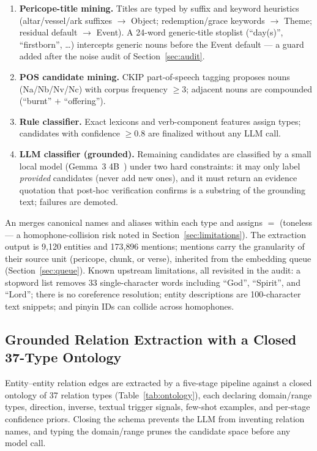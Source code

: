 \begin{enumerate}
\item \textbf{Pericope-title mining.} Titles are typed by suffix and
keyword heuristics (altar/vessel/ark suffixes $\to$ Object;
redemption/grace keywords $\to$ Theme; residual default $\to$ Event). A
24-word generic-title stoplist (``day(s)'', ``firstborn'', \ldots)
intercepts generic nouns before the Event default --- a guard added after
the noise audit of Section~\ref{sec:audit}.
\item \textbf{POS candidate mining.} CKIP part-of-speech tagging proposes
nouns (Na/Nb/Nv/Nc) with corpus frequency $\ge 3$; adjacent nouns are
compounded (\eg ``burnt'' $+$ ``offering'').
\item \textbf{Rule classifier.} Exact lexicons and verb-component
features assign types; candidates with confidence $\ge 0.8$ are finalized
without any LLM call.
\item \textbf{LLM classifier (grounded).} Remaining candidates are
classified by a small local model (Gemma~3
4B~\cite{gemmateam2025gemma3}) under two hard constraints: it may only
label \emph{provided} candidates (never add new ones), and it must return
an evidence quotation that post-hoc verification confirms is a substring
of the grounding text; failures are demoted.
\end{enumerate}

An  merges canonical names and aliases within each
type and assigns  $=$ 
(toneless  --- a homophone-collision risk noted in
Section~\ref{sec:limitations}). The extraction output is 9{,}120 entities
and 173{,}896 mentions; mentions carry the granularity of their source
unit (pericope, chunk, or verse), inherited from the embedding queue
(Section~\ref{sec:queue}). Known upstream limitations, all revisited in
the audit: a stopword list removes 33 single-character words including
``God'', ``Spirit'', and ``Lord''; there is no coreference resolution;
entity descriptions are 100-character text snippets; and pinyin IDs can
collide across homophones.

\subsection{Grounded Relation Extraction with a Closed 37-Type Ontology}
\label{sec:relation}

Entity--entity relation edges are extracted by a five-stage pipeline against a
closed ontology of 37 relation types (Table~\ref{tab:ontology}), each
declaring domain/range types, direction, inverse, textual trigger
signals, few-shot examples, and per-stage confidence priors. Closing the
schema prevents the LLM from inventing relation names, and typing the
domain/range prunes the candidate space before any model call.

